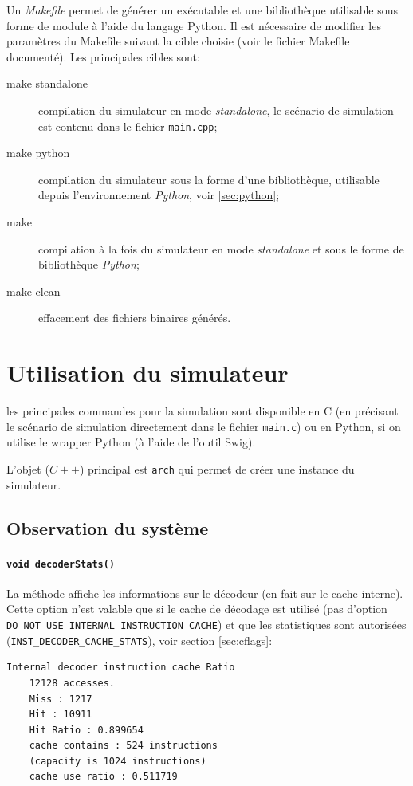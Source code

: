 Un \emph{Makefile} permet de générer un exécutable et une bibliothèque utilisable sous forme de module à l'aide du langage Python. Il est nécessaire de modifier les paramètres du Makefile suivant la cible choisie (voir le fichier Makefile documenté). Les principales cibles sont:
\begin{description}
\item[make standalone] compilation du simulateur en mode \emph{standalone}, le scénario de simulation est contenu dans le fichier \texttt{main.cpp};
\item[make python] compilation du simulateur sous la forme d'une bibliothèque, utilisable depuis l'environnement \emph{Python}, voir \ref{sec:python};
\item[make] compilation à la fois du simulateur en mode \emph{standalone} et sous le forme de bibliothèque \emph{Python};
\item[make clean] effacement des fichiers binaires générés.
\end{description}


\section{Utilisation du simulateur}
les principales commandes pour la simulation sont disponible en C (en précisant le scénario de simulation directement dans le fichier \texttt{main.c}) ou en Python, si on utilise le wrapper Python (à l'aide de l'outil Swig).

L'objet ($C++$) principal est \texttt{arch} qui permet de créer une instance du simulateur.

\subsection{Observation du système}

\paragraph{\texttt{void decoderStats()}}
La méthode affiche les informations sur le décodeur (en fait sur le cache interne). Cette option n'est valable que si le cache de décodage est utilisé (pas d'option \texttt{DO\_NOT\_USE\_INTERNAL\_INSTRUCTION\_CACHE}) et que les statistiques sont autorisées (\texttt{INST\_DECODER\_CACHE\_STATS}), voir section \ref{sec:cflags}:
\begin{verbatim}
Internal decoder instruction cache Ratio
    12128 accesses.
    Miss : 1217
    Hit : 10911
    Hit Ratio : 0.899654
    cache contains : 524 instructions
    (capacity is 1024 instructions)
    cache use ratio : 0.511719
\end{verbatim}

